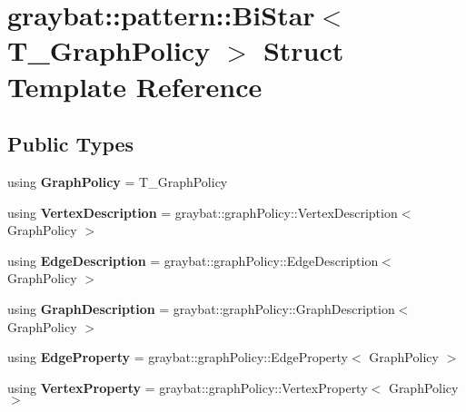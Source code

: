 \hypertarget{structgraybat_1_1pattern_1_1BiStar}{}\section{graybat\+:\+:pattern\+:\+:Bi\+Star$<$ T\+\_\+\+Graph\+Policy $>$ Struct Template Reference}
\label{structgraybat_1_1pattern_1_1BiStar}
\subsection*{Public Types}
\begin{DoxyCompactItemize}
\item 
\hypertarget{structgraybat_1_1pattern_1_1BiStar_ac59d113028fb3b57cc8044585121f697}{}using {\bfseries Graph\+Policy} = T\+\_\+\+Graph\+Policy\label{structgraybat_1_1pattern_1_1BiStar_ac59d113028fb3b57cc8044585121f697}

\item 
\hypertarget{structgraybat_1_1pattern_1_1BiStar_a2e042b47d1edb7501181a249a2ae2a0d}{}using {\bfseries Vertex\+Description} = graybat\+::graph\+Policy\+::\+Vertex\+Description$<$ Graph\+Policy $>$\label{structgraybat_1_1pattern_1_1BiStar_a2e042b47d1edb7501181a249a2ae2a0d}

\item 
\hypertarget{structgraybat_1_1pattern_1_1BiStar_a1778f38420cdbc819c8c94be96629d09}{}using {\bfseries Edge\+Description} = graybat\+::graph\+Policy\+::\+Edge\+Description$<$ Graph\+Policy $>$\label{structgraybat_1_1pattern_1_1BiStar_a1778f38420cdbc819c8c94be96629d09}

\item 
\hypertarget{structgraybat_1_1pattern_1_1BiStar_a909139cb3caa47a7fe369c839ed77ccb}{}using {\bfseries Graph\+Description} = graybat\+::graph\+Policy\+::\+Graph\+Description$<$ Graph\+Policy $>$\label{structgraybat_1_1pattern_1_1BiStar_a909139cb3caa47a7fe369c839ed77ccb}

\item 
\hypertarget{structgraybat_1_1pattern_1_1BiStar_ac448e89b5a2d1bcc23389a3cab55edbf}{}using {\bfseries Edge\+Property} = graybat\+::graph\+Policy\+::\+Edge\+Property$<$ Graph\+Policy $>$\label{structgraybat_1_1pattern_1_1BiStar_ac448e89b5a2d1bcc23389a3cab55edbf}

\item 
\hypertarget{structgraybat_1_1pattern_1_1BiStar_ae7c54edb7fb77ffcafb67f40724de7a4}{}using {\bfseries Vertex\+Property} = graybat\+::graph\+Policy\+::\+Vertex\+Property$<$ Graph\+Policy $>$\label{structgraybat_1_1pattern_1_1BiStar_ae7c54edb7fb77ffcafb67f40724de7a4}

\end{DoxyCompactItemize}
